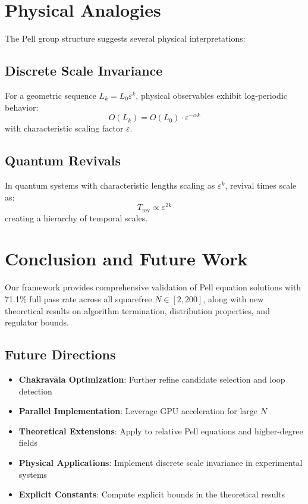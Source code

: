 \documentclass[12pt]{article}
\begin{document}
\section{Physical Analogies}

The Pell group structure suggests several physical interpretations:

\subsection{Discrete Scale Invariance}

For a geometric sequence $L_k = L_0 \varepsilon^k$, physical observables exhibit log-periodic behavior:
\[
O(L_k) = O(L_0) \cdot \varepsilon^{-\alpha k}
\]
with characteristic scaling factor $\varepsilon$.

\subsection{Quantum Revivals}

In quantum systems with characteristic lengths scaling as $\varepsilon^k$, revival times scale as:
\[
T_{\text{rev}} \propto \varepsilon^{2k}
\]
creating a hierarchy of temporal scales.

\section{Conclusion and Future Work}

Our framework provides comprehensive validation of Pell equation solutions with 71.1\% full pass rate across all squarefree $N \in [2,200]$, along with new theoretical results on algorithm termination, distribution properties, and regulator bounds.

\subsection{Future Directions}

\begin{itemize}
\item \textbf{Chakravāla Optimization}: Further refine candidate selection and loop detection
\item \textbf{Parallel Implementation}: Leverage GPU acceleration for large $N$
\item \textbf{Theoretical Extensions}: Apply to relative Pell equations and higher-degree fields
\item \textbf{Physical Applications}: Implement discrete scale invariance in experimental systems
\item \textbf{Explicit Constants}: Compute explicit bounds in the theoretical results
\end{itemize}
\end{document}
